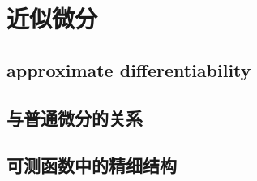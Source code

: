 \section{近似微分}
\label{b1:sec:1603}


\subsection{approximate differentiability}
\label{b1:subsec:160301}

\subsection{与普通微分的关系}
\label{b1:subsec:160302}

\subsection{可测函数中的精细结构}
\label{b1:subsec:160303}


